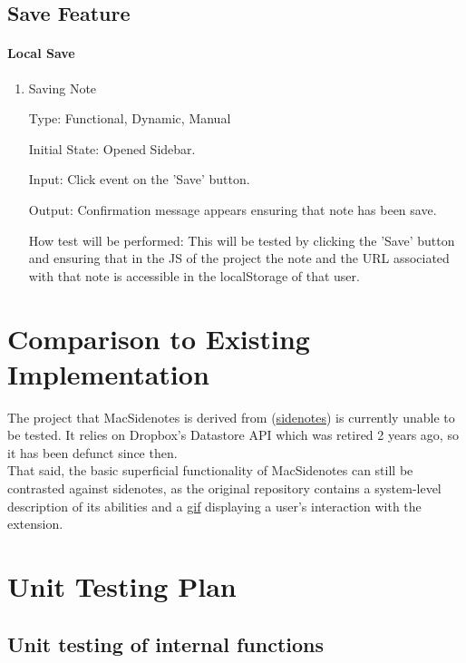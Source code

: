 \documentclass[12pt, titlepage]{article}
\begin{document}
\subsection{Save Feature}

\paragraph{Local Save}

\begin{enumerate}
	
	\item{Saving Note\\}
	
	Type: Functional, Dynamic, Manual
	
	Initial State: Opened Sidebar.
	
	Input: Click event on the 'Save' button.
	
	Output: Confirmation message appears ensuring that note has been save.
	
	How test will be performed: This will be tested by clicking the 'Save' button and 
	ensuring that in the JS  of the project the note and the URL associated with that note 
	is accessible in the localStorage of that user. 
	
\end{enumerate}
	
\section{Comparison to Existing Implementation}	
	The project that MacSidenotes is derived from 
	(\href{https://github.com/sidenotes/sidenotes}{sidenotes}) is currently 
	unable to be tested. It relies on Dropbox's Datastore API which was retired 
	2 years ago, so it has been defunct since then.\\
	That said, the basic superficial functionality of MacSidenotes can still be 
	contrasted against sidenotes, as the original repository contains a 
	system-level description of its abilities and a 
	\href{https://github.com/sidenotes/sidenotes/blob/master/images/Sidenotes-Screenflow.gif}
	{gif} displaying a user's interaction with the extension.
\section{Unit Testing Plan}
		
\subsection{Unit testing of internal functions}
\end{document}
